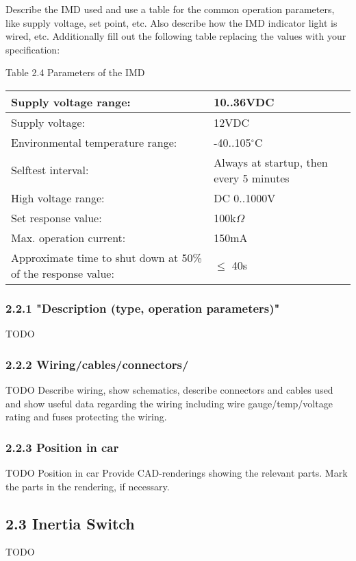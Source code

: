 \documentclass{article}
\begin{document}
Describe the IMD used and use a table for the common operation parameters, like supply voltage, set point, etc. Also describe how the IMD indicator light is wired, etc.
Additionally fill out the following table replacing the values with your specification:


Table 2.4 Parameters of the IMD
\begin{center}
\begin{tabular}{|l|l|}
\hline
Supply voltage range: &  10..36VDC \\
\hline
Supply voltage: &  12VDC\\
\hline
Environmental temperature range: &  -40..105$^{\circ}$C \\
\hline
Selftest interval: &  Always at startup, then every 5 minutes \\
\hline
High voltage range: &  DC 0..1000V \\
\hline
Set response value: &  100k$\Omega$ \\
\hline
Max. operation current: &  150mA \\
\hline
Approximate time to shut down at 50\% of the response value:&  $\leq$ 40s \\
\hline
\end{tabular}
\end{center}





\subsubsection*{2.2.1 "Description (type, operation parameters)"}
TODO

\subsubsection*{2.2.2 Wiring/cables/connectors/}
TODO
Describe wiring, show schematics, describe connectors and cables used and show useful data regarding the wiring including wire gauge/temp/voltage rating and fuses protecting the wiring.

\subsubsection*{2.2.3 Position in car}
TODO
Position in car
Provide CAD-renderings showing the relevant parts. Mark the parts in the rendering, if necessary.

\subsection*{2.3 Inertia Switch}
TODO
\end{document}
